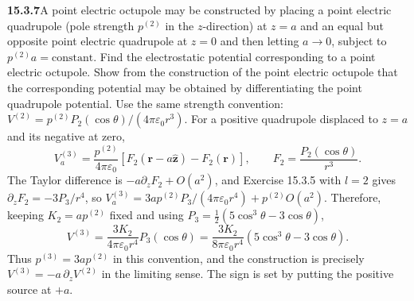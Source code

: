 \par\bigskip
\noindent\textbf{15.3.7}\quad A point electric octupole may be
constructed by placing a point electric quadrupole (pole strength
$p^{(2)}$ in the $z$-direction) at $z=a$ and an equal but opposite
point electric quadrupole at $z=0$ and then letting $a\to0$, subject
to $p^{(2)}a=\mathrm{constant}$. Find the electrostatic potential
corresponding to a point electric octupole. Show from the
construction of the point electric octupole that the corresponding
potential may be obtained by differentiating the point quadrupole
potential.
\solution
Use the same strength convention:
$V^{(2)}=p^{(2)}P_2(\cos\theta)/(4\pi\varepsilon_0r^3)$.
For a positive quadrupole displaced to $z=a$ and its negative at zero,
\[
V_a^{(3)}=\frac{p^{(2)}}{4\pi\varepsilon_0}
\left[F_2(\mathbf r-a\hat{\mathbf z})-F_2(\mathbf r)\right],
\qquad F_2=\frac{P_2(\cos\theta)}{r^3}.
\]
The Taylor difference is $-a\partial_zF_2+O(a^2)$, and
Exercise 15.3.5 with $l=2$ gives $\partial_zF_2=-3P_3/r^4$, so
$V_a^{(3)}=3ap^{(2)}P_3/(4\pi\varepsilon_0r^4)+p^{(2)}O(a^2)$.
Therefore, keeping $K_2=ap^{(2)}$ fixed and using
$P_3=\frac12(5\cos^3\theta-3\cos\theta)$,
\[
\boxed{V^{(3)}=\frac{3K_2}{4\pi\varepsilon_0r^4}P_3(\cos\theta)
=\frac{3K_2}{8\pi\varepsilon_0r^4}(5\cos^3\theta-3\cos\theta)}.
\]
Thus $p^{(3)}=3ap^{(2)}$ in this convention, and the construction
is precisely $V^{(3)}=-a\,\partial_zV^{(2)}$ in the limiting sense.
The sign is set by putting the positive source at $+a$.

